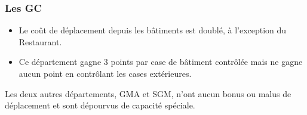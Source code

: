 \subsubsection{Les GC}
\begin{itemize}
\item Le coût de déplacement depuis les bâtiments est doublé, à l'exception du Restaurant. 
\item Ce département gagne 3 points par case de bâtiment contrôlée mais ne gagne aucun point en contrôlant les cases extérieures. 
\end{itemize}

Les deux autres départements, GMA et SGM, n'ont aucun bonus ou malus de déplacement et sont dépourvus de capacité spéciale.
